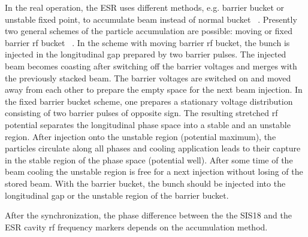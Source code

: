 In the real operation, the ESR uses different methods, e.g. barrier bucket or unstable fixed point, to accumulate beam instead of normal bucket ~\cite{steck_demonstration_2011}.  Presently two general schemes of the particle accumulation are possible: moving or fixed barrier rf bucket ~\cite{smirnov_particle_2009}. In the scheme with moving barrier rf bucket, the bunch is injected in the longitudinal gap prepared by two barrier pulses. The injected beam becomes coasting after switching off the barrier voltages and merges with the previously stacked beam. The barrier voltages are switched on and moved away from each other to prepare the empty space for the next beam injection. In the fixed barrier bucket scheme, one prepares a stationary voltage distribution consisting of two barrier pulses of opposite sign. The resulting stretched rf potential separates the longitudinal phase space into a stable and an unstable region. After injection onto the unstable region (potential maximum), the particles circulate along all phases and cooling application leads to their capture in the stable region of the phase space (potential well). After some time of the beam cooling the unstable region is free for a next injection without losing of the stored beam. With the barrier bucket, the bunch should be injected into the longitudinal gap or the unstable region of the barrier bucket.

After the synchronization, the phase difference between the the SIS18 and the ESR cavity rf frequency markers depends on the accumulation method.


